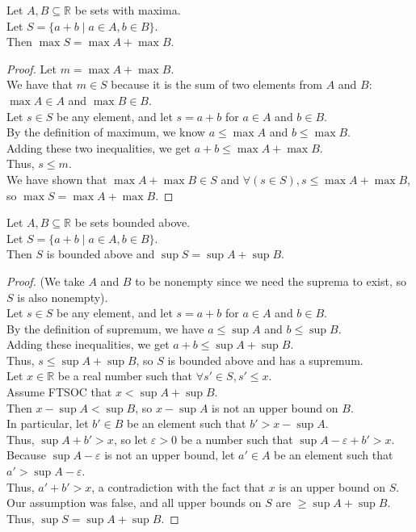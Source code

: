 \documentclass{article}
\newenvironment{theorem}[1]{\renewcommand\theinnercustomthm{#1}\innercustomthm}
  {\endinnercustomthm}
\begin{document}
\begin{theorem}{5}
    Let $A,B\subseteq \mathbb R$ be sets with maxima. \\ Let $S = \{a + b \mid a \in A,b\in B\}$.\\
    Then $\max S = \max A + \max B$.
\end{theorem}
\begin{proof}
Let $m = \max A + \max B$. \\
We have that $m \in S$ because it is the sum of two elements from $A$ and $B$: $\max A \in A$ and $\max B \in B$. \\
Let $s \in S$ be any element, and let $s = a + b$ for $a \in A$ and $b \in B$. \\
By the definition of maximum, we know $a \le \max A$ and $b \le \max B$. \\
Adding these two inequalities, we get $a + b \le \max A + \max B$. \\
Thus, $s \le m$. \\
We have shown that $\max A + \max B \in S$ and $\forall(s \in S), s \le \max A + \max B$, so $\max S = \max A + \max B$.
\end{proof}
\newpage{}
\begin{theorem}{6}
Let $A,B \subseteq \mathbb R$ be sets bounded above. \\
Let $S = \{a+b \mid a \in A, b \in B\}$. \\
Then $S$ is bounded above and $\sup S = \sup A + \sup B$.
\end{theorem}
\begin{proof}
    (We take $A$ and $B$ to be nonempty since we need the suprema to exist, so $S$ is also nonempty). \\
    Let $s \in S$ be any element, and let $s = a + b$ for $a \in A$ and $b\in B$. \\
    By the definition of supremum, we have $a \le \sup A$ and $b \le \sup B$. \\
    Adding these inequalities, we get $a + b \le \sup A + \sup B$. \\
    Thus, $s \le \sup A + \sup B$, so $S$ is bounded above and has a supremum. \\
    Let $x \in \mathbb R$ be a real number such that $\forall s'\in S, s' \le x$. \\
    Assume FTSOC that $x < \sup A + \sup B$. \\
    Then $x - \sup A < \sup B$, so $x - \sup A$ is not an upper bound on $B$. \\
    In particular, let $b' \in B$ be an element such that $b' > x - \sup A$. \\
    Thus, $\sup A + b' > x$, so let $\varepsilon > 0$ be a number such that $\sup A - \varepsilon + b' > x$.
    Because $\sup A - \varepsilon$ is not an upper bound, let $a'\in A$ be an element such that $a' > \sup A - \varepsilon$.\\
    Thus, $a' + b' > x$, a contradiction with the fact that $x$ is an upper bound on $S$. \\
    Our assumption was false, and all upper bounds on $S$ are $\ge \sup A + \sup B$.
    Thus, $\sup S = \sup A + \sup B$.

    
\end{proof}
\end{document}
